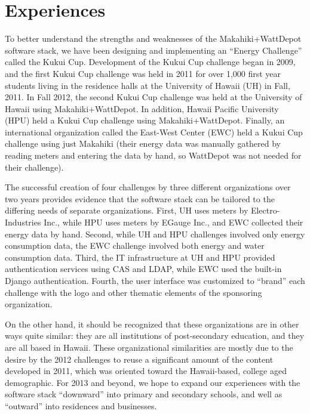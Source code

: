 \section{Experiences}

To better understand the strengths and weaknesses of the Makahiki+WattDepot software stack, we have been designing and implementing an ``Energy Challenge'' called the Kukui Cup.  Development of the Kukui Cup challenge began in 2009, and the first Kukui Cup challenge was held in 2011 for over 1,000 first year students living in the residence halls at the University of Hawaii (UH) in Fall, 2011.  In Fall 2012, the second Kukui Cup challenge was held at the University of Hawaii using Makahiki+WattDepot.  In addition, Hawaii Pacific University (HPU) held a Kukui Cup challenge using Makahiki+WattDepot. Finally, an international organization called the East-West Center (EWC) held a Kukui Cup challenge using just Makahiki (their energy data was manually gathered by reading meters and entering the data by hand, so WattDepot was not needed for their challenge).    

The successful creation of four challenges by three different organizations over two years provides evidence that the software stack can be tailored to the differing needs of separate organizations.  First, UH uses meters by Electro-Industries Inc., while HPU uses meters by EGauge Inc., and EWC collected their energy data by hand. Second, while UH and HPU challenges involved only energy consumption data, the EWC challenge involved both energy and water consumption data.  Third, the IT infrastructure at UH and HPU provided authentication services using CAS and LDAP, while EWC used the built-in Django authentication. Fourth, the user interface was customized to ``brand'' each challenge with the logo and other thematic elements of the sponsoring organization. 

On the other hand, it should be recognized that these organizations are in other ways quite similar: they are all institutions of post-secondary education, and they are all based in Hawaii.  These organizational similarities are mostly due to the desire by the 2012 challenges to reuse a significant amount of the content developed in 2011, which was oriented toward the Hawaii-based, college aged demographic. For 2013 and beyond, we hope to expand our experiences with the software stack  ``downward'' into primary and secondary schools, and well as ``outward'' into residences and businesses. 

